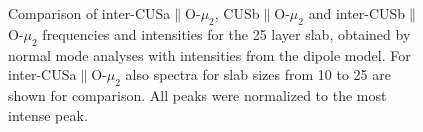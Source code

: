 \documentclass[11pt,DIV=13,BCOR=5mm,a4paper,headinclude]{scrbook}
\begin{document}
\begin{figure}[!h]
             \quad
             \caption{Comparison of inter-CUSa$\parallel$O-$\mu_2$, CUSb$\parallel$O-$\mu_2$ and inter-CUSb$\parallel$O-$\mu_2$ frequencies and intensities for the 25 layer slab, obtained by normal mode analyses with intensities from the dipole model.
             For inter-CUSa$\parallel$O-$\mu_2$ also spectra for slab sizes from 10 to 25 are shown for comparison.
             All peaks were normalized to the most intense peak.}
            \label{abb:iCa2+Cb2+iCb2_25_comp} %
\end{figure}
\end{document}
